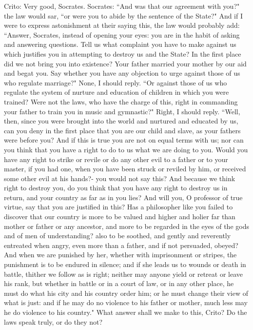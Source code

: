 Crito: Very good, Socrates. 
Socrates: ``And was that our agreement with you?" the law would sar, ``or
were you to abide by the sentence of the State?" And if I were to
express astonishment at their saying this, the law would probably
add: ``Answer, Socrates, instead of opening your eyes: you are in the
habit of asking and answering questions. Tell us what complaint you
have to make against us which justifies you in attempting to destroy
us and the State? In the first place did we not bring you into existence?
Your father married your mother by our aid and begat you. Say whether
you have any objection to urge against those of us who regulate marriage?"
None, I should reply. ``Or against those of us who regulate the system
of nurture and education of children in which you were trained? Were
not the laws, who have the charge of this, right in commanding your
father to train you in music and gymnastic?" Right, I should reply.
``Well, then, since you were brought into the world and nurtured and
educated by us, can you deny in the first place that you are our child
and slave, as your fathers were before you? And if this is true you
are not on equal terms with us; nor can you think that you have a
right to do to us what we are doing to you. Would you have any right
to strike or revile or do any other evil to a father or to your master,
if you had one, when you have been struck or reviled by him, or received
some other evil at his hands?- you would not say this? And because
we think right to destroy you, do you think that you have any right
to destroy us in return, and your country as far as in you lies? And
will you, O professor of true virtue, say that you are justified in
this? Has a philosopher like you failed to discover that our country
is more to be valued and higher and holier far than mother or father
or any ancestor, and more to be regarded in the eyes of the gods and
of men of understanding? also to be soothed, and gently and reverently
entreated when angry, even more than a father, and if not persuaded,
obeyed? And when we are punished by her, whether with imprisonment
or stripes, the punishment is to be endured in silence; and if she
leads us to wounds or death in battle, thither we follow as is right;
neither may anyone yield or retreat or leave his rank, but whether
in battle or in a court of law, or in any other place, he must do
what his city and his country order him; or he must change their view
of what is just: and if he may do no violence to his father or mother,
much less may he do violence to his country." What answer shall we
make to this, Crito? Do the laws speak truly, or do they not?

